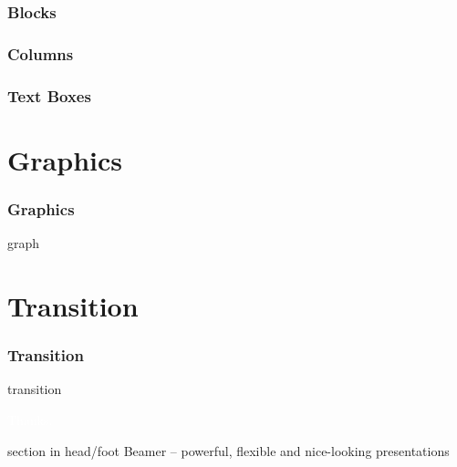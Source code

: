 \documentclass[aspectratio=169,utf8]{ctexbeamer}
\begin{document}
\begin{frame}
  \frametitle{Blocks}
\end{frame}

\begin{frame}
  \frametitle{Columns}
\end{frame}

\begin{frame}
  \frametitle{Text Boxes}
\end{frame}

\section{Graphics}
\begin{frame}
  \frametitle{Graphics}
  graph
\end{frame}


\section{Transition}
\begin{frame}
  \frametitle{Transition}
  transition
\end{frame}

\addtocounter{framenumber}{-1}


\begin{frame}[plain, b]
  \centering
  \Large \textcolor{white}{Thanks.}
  \normalsize

  \vspace*{\fill}

  \begin{beamercolorbox}[wd=\paperwidth]{section in head/foot}
    \centering
    \vskip3pt
    {\small Beamer -- powerful, flexible and nice-looking presentations}
    \vskip8pt
  \end{beamercolorbox}
  
\end{frame}
\end{document}
